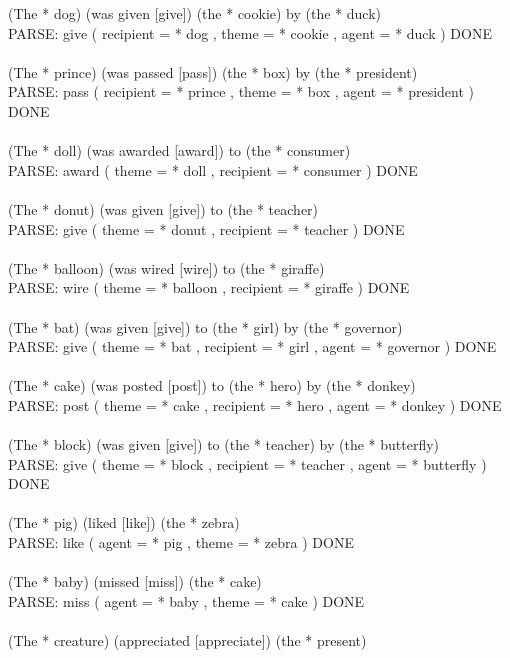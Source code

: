 \documentclass{article} \usepackage{iclr2022_conference,times}
\begin{document}
{(The * dog) (was given [give]) (the * cookie) by (the * duck) \\
PARSE: give ( recipient = * dog , theme = * cookie , agent = * duck ) DONE \\
 \\
(The * prince) (was passed [pass]) (the * box) by (the * president) \\
PARSE: pass ( recipient = * prince , theme = * box , agent = * president ) DONE \\
 \\
(The * doll) (was awarded [award]) to (the * consumer) \\
PARSE: award ( theme = * doll , recipient = * consumer ) DONE \\
 \\
(The * donut) (was given [give]) to (the * teacher) \\
PARSE: give ( theme = * donut , recipient = * teacher ) DONE \\
 \\
(The * balloon) (was wired [wire]) to (the * giraffe) \\
PARSE: wire ( theme = * balloon , recipient = * giraffe ) DONE \\
 \\
(The * bat) (was given [give]) to (the * girl) by (the * governor) \\
PARSE: give ( theme = * bat , recipient = * girl , agent = * governor ) DONE \\
 \\
(The * cake) (was posted [post]) to (the * hero) by (the * donkey) \\
PARSE: post ( theme = * cake , recipient = * hero , agent = * donkey ) DONE \\
 \\
(The * block) (was given [give]) to (the * teacher) by (the * butterfly) \\
PARSE: give ( theme = * block , recipient = * teacher , agent = * butterfly ) DONE \\
 \\
(The * pig) (liked [like]) (the * zebra) \\
PARSE: like ( agent = * pig , theme = * zebra ) DONE \\
 \\
(The * baby) (missed [miss]) (the * cake) \\
PARSE: miss ( agent = * baby , theme = * cake ) DONE \\
 \\
(The * creature) (appreciated [appreciate]) (the * present) \\
}
\end{document}
